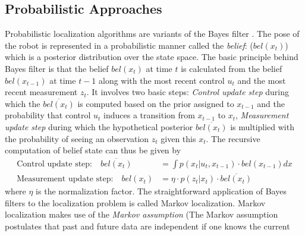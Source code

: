 \subsection{Probabilistic Approaches}
\label{ssec:prob_approaches}
	Probabilistic localization algorithms are variants of the Bayes filter \cite{thrun2005probabilistic}. The pose of the robot is represented in a probabilistic manner called the \emph{belief}: ($bel(x_t)$) which is a posterior distribution over the state space. The basic principle behind Bayes filter is that the belief $bel(x_t)$ at time $t$ is calculated from the belief $bel(x_{t-1})$ at time $t-1$ along with the most recent control $u_t$ and the most recent measurement $z_t$. It involves two basic steps: \emph{Control update step} during which the $\overline{bel(x_t)}$ is computed based on the prior assigned to $x_{t-1}$ and the probability that control $u_t$ induces a transition from $x_{t-1}$ to $x_t$, \emph{Measurement update step} during which the hypothetical posterior $\overline{bel(x_t)}$ is multiplied with the probability of seeing an observation $z_t$ given this $x_t$. The recursive computation of belief state can thus be given by
	\begin{align*}
	\text{Control update step:}\quad \overline{bel(x_t)} &= \int p(x_t\vert u_t,x_{t-1})\cdot bel(x_{t-1}) dx \\
	\text{Measurement update step:}\quad {bel(x_t)} &= \eta\cdot p(z_t\vert x_{t})\cdot \overline{bel(x_t)}
	\end{align*}
	where $\eta$ is the normalization factor.
	The straightforward application of Bayes filters to the localization problem is called Markov localization. Markov localization makes use of the \emph{Markov assumption} (The Markov
assumption postulates that past and future data are independent if one knows the current

